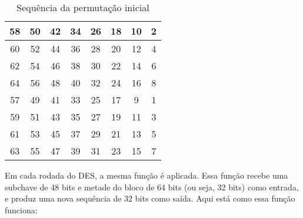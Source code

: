 \begin{table}[h!]
\centering
\begin{tabular}{|*{8}{c|}}
\hline
58 & 50 & 42 & 34 & 26 & 18 & 10 & 2 \\
\hline
60 & 52 & 44 & 36 & 28 & 20 & 12 & 4 \\
\hline
62 & 54 & 46 & 38 & 30 & 22 & 14 & 6 \\
\hline
64 & 56 & 48 & 40 & 32 & 24 & 16 & 8 \\
\hline
57 & 49 & 41 & 33 & 25 & 17 & 9  & 1 \\
\hline
59 & 51 & 43 & 35 & 27 & 19 & 11 & 3 \\
\hline
61 & 53 & 45 & 37 & 29 & 21 & 13 & 5 \\
\hline
63 & 55 & 47 & 39 & 31 & 23 & 15 & 7 \\
\hline
\end{tabular}
\label{tab:IP}
\caption{Sequência da permutação inicial}
\end{table}

Em cada rodada do DES, a mesma função é aplicada.
Essa função recebe uma subchave de 48 bits e metade do bloco de 64 bits (ou seja, 32 bits) como entrada, e produz uma nova sequência de 32 bits como saída.
Aqui está como essa função funciona:

